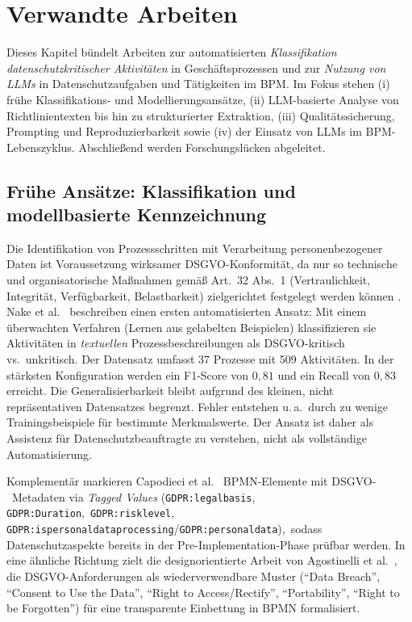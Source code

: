 \section{Verwandte Arbeiten}\label{sec:verwandte-arbeiten}

Dieses Kapitel bündelt Arbeiten zur automatisierten \emph{Klassifikation datenschutzkritischer Aktivitäten} in Geschäftsprozessen und zur \emph{Nutzung von \acp{LLM}} in Datenschutzaufgaben und Tätigkeiten im \ac{BPM}. Im Fokus stehen (i) frühe Klassifikations- und Modellierungsansätze, (ii) \ac{LLM}-basierte Analyse von Richtlinientexten bis hin zu strukturierter Extraktion, (iii) Qualitätssicherung, Prompting und Reproduzierbarkeit sowie (iv) der Einsatz von \acp{LLM} im \ac{BPM}-Lebenszyklus. Abschließend werden Forschungslücken abgeleitet.

\subsection*{Frühe Ansätze: Klassifikation und modellbasierte Kennzeichnung}

Die Identifikation von Prozessschritten mit Verarbeitung personenbezogener Daten ist Voraussetzung wirksamer \ac{DSGVO}-Konformität, da nur so technische und organisatorische Maßnahmen gemäß Art.~32 Abs.~1 (Vertraulichkeit, Integrität, Verfügbarkeit, Belastbarkeit) zielgerichtet festgelegt werden können \cite{GDPR2016}. Nake et al.\ \cite{nake2023towards} beschreiben einen ersten automatisierten Ansatz: Mit einem überwachten Verfahren (Lernen aus gelabelten Beispielen) klassifizieren sie Aktivitäten in \emph{textuellen} Prozessbeschreibungen als \ac{DSGVO}-kritisch vs.\ unkritisch. Der Datensatz umfasst 37 Prozesse mit 509 Aktivitäten. In der stärksten Konfiguration werden ein F1-Score von $0{,}81$ und ein Recall von $0{,}83$ erreicht. Die Generalisierbarkeit bleibt aufgrund des kleinen, nicht repräsentativen Datensatzes begrenzt. Fehler entstehen u.\,a.\ durch zu wenige Trainingsbeispiele für bestimmte Merkmalswerte. Der Ansatz ist daher als Assistenz für Datenschutzbeauftragte zu verstehen, nicht als vollständige Automatisierung.

Komplementär markieren Capodieci et al.\ \cite{Capodieci2023BPMNEnabledDP} \ac{BPMN}-Elemente mit \ac{DSGVO}-\linebreak~Metadaten via \emph{Tagged Values} (\texttt{GDPR:legalbasis}, \texttt{GDPR:Duration},\linebreak~\texttt{GDPR:risklevel}, \texttt{GDPR:ispersonaldataprocessing}/\texttt{GDPR:personaldata}),\linebreak~sodass Datenschutzaspekte bereits in der Pre-Implementation-Phase prüfbar werden. In eine ähnliche Richtung zielt die designorientierte Arbeit von Agostinelli et al.\ \cite{agostinelli2019achievingGDPRComliance}, die \ac{DSGVO}-Anforderungen als wiederverwendbare Muster (\enquote{Data Breach}, \enquote{Consent to Use the Data}, \enquote{Right to Access/Rectify}, \enquote{Portability}, \enquote{Right to be Forgotten}) für eine transparente Einbettung in \ac{BPMN} formalisiert.


